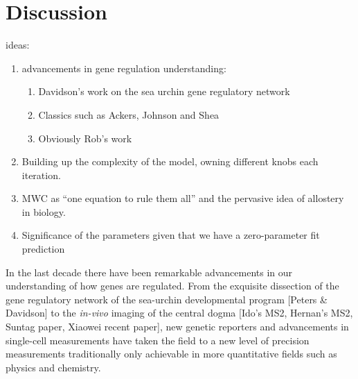 \pagebreak
\section*{Discussion }


ideas:
\begin{enumerate}
  \item advancements in gene regulation understanding:
    \begin{enumerate}
      \item Davidson's work on the sea urchin gene regulatory network
      \item Classics such as Ackers, Johnson and Shea
      \item Obviously Rob's work
    \end{enumerate}
  \item Building up the complexity of the model, owning different knobs each
  iteration.
  \item MWC as ``one equation to rule them all'' and the pervasive idea of
  allostery in biology.
  \item Significance of the parameters given that we have a zero-parameter fit
  prediction
\end{enumerate}

In the last decade there have been remarkable advancements in our  understanding
of how genes are regulated. From the exquisite dissection of the gene regulatory
network of the sea-urchin developmental program [Peters & Davidson] to the
\textit{in-vivo}  imaging of the central dogma [Ido's MS2, Hernan's MS2, Suntag
paper, Xiaowei recent paper], new genetic reporters and  advancements in
single-cell measurements have taken the field to a new level of precision
measurements traditionally only achievable in more quantitative fields such as
physics and chemistry.

